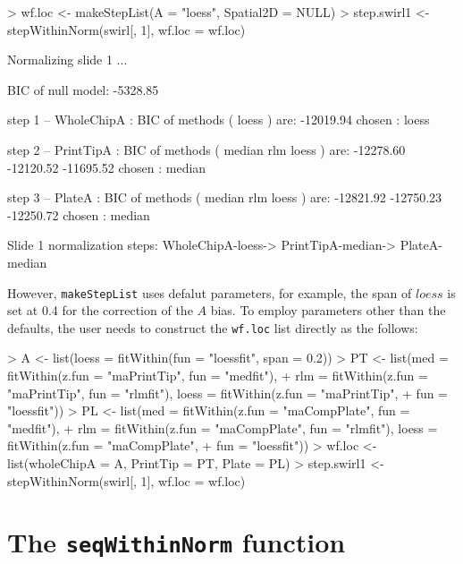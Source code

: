 \documentclass[11pt]{article}
\newcommand{\code}[1]{{\tt #1}}
\newcommand{\Rfunc}[1]{{\tt #1}}
\begin{document}
\begin{Schunk}
\begin{Sinput}
> wf.loc <- makeStepList(A = "loess", Spatial2D = NULL)
> step.swirl1 <- stepWithinNorm(swirl[, 1], wf.loc = wf.loc)
\end{Sinput}
\begin{Soutput}
Normalizing slide  1 ...

BIC of null model:  -5328.85 

step  1 -- WholeChipA :
BIC of methods ( loess ) are:  -12019.94 
chosen :  loess 

step  2 -- PrintTipA :
BIC of methods ( median rlm loess ) are:  -12278.60 -12120.52 -11695.52 
chosen :  median 

step  3 -- PlateA :
BIC of methods ( median rlm loess ) are:  -12821.92 -12750.23 -12250.72 
chosen :  median 

Slide 1 normalization steps:  WholeChipA-loess-> PrintTipA-median-> PlateA-median 
\end{Soutput}
\end{Schunk}

However, \Rfunc{makeStepList} uses defalut parameters, for example, the span of 
$loess$ is set at 0.4 for the correction of the $A$ bias. To employ
parameters other than the defaults, the user needs to construct the \code{wf.loc}
list directly as the follows:

\begin{Schunk}
\begin{Sinput}
> A <- list(loess = fitWithin(fun = "loessfit", span = 0.2))
> PT <- list(med = fitWithin(z.fun = "maPrintTip", fun = "medfit"), 
+     rlm = fitWithin(z.fun = "maPrintTip", fun = "rlmfit"), loess = fitWithin(z.fun = "maPrintTip", 
+         fun = "loessfit"))
> PL <- list(med = fitWithin(z.fun = "maCompPlate", fun = "medfit"), 
+     rlm = fitWithin(z.fun = "maCompPlate", fun = "rlmfit"), loess = fitWithin(z.fun = "maCompPlate", 
+         fun = "loessfit"))
> wf.loc <- list(wholeChipA = A, PrintTip = PT, Plate = PL)
> step.swirl1 <- stepWithinNorm(swirl[, 1], wf.loc = wf.loc)
\end{Sinput}
\end{Schunk}

 


\section{The \Rfunc{seqWithinNorm} function} 
\end{document}
